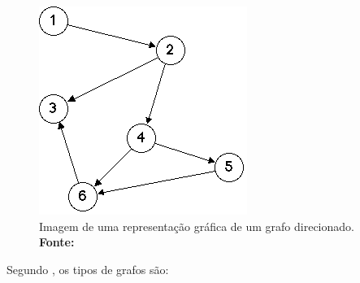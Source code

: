 \begin{figure}[h!]
	\centerline{\includegraphics[scale=0.6]{./imagens/simple_digraph_graph.png}}
	\caption[Imagem de uma representação gráfica de um grafo direcionado]
	{Imagem de uma representação gráfica de um grafo direcionado. \textbf{Fonte:} }
	\label{fig:exemplo1}
\end{figure}

Segundo , os tipos de grafos são:

